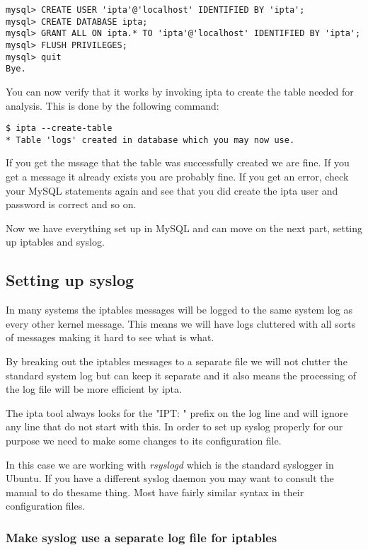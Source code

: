 \documentclass[english,twoside,openright,a4paper,12pt]{article}
\begin{document}
\small
\begin{verbatim}
mysql> CREATE USER 'ipta'@'localhost' IDENTIFIED BY 'ipta';
mysql> CREATE DATABASE ipta;
mysql> GRANT ALL ON ipta.* TO 'ipta'@'localhost' IDENTIFIED BY 'ipta';
mysql> FLUSH PRIVILEGES;
mysql> quit
Bye.
\end{verbatim}
\normalsize

You can now verify that it works by invoking ipta to create the table 
needed for analysis. This is done by the following command:

\begin{verbatim}
$ ipta --create-table
* Table 'logs' created in database which you may now use.
\end{verbatim}

If you get the mssage that the table was successfully created we are
fine. If you get a message it already exists you are probably fine. If
you get an error, check your MySQL statements again and see that you
did create the ipta user and password is correct and so on.

Now we have everything set up in MySQL and can move on the next part,
setting up iptables and syslog.

\subsection{Setting up syslog}

In many systems the iptables messages will be logged to the same
system log as every other kernel message. This means we will have logs
cluttered with all sorts of messages making it hard to see what is
what.

By breaking out the iptables messages to a separate file we will not
clutter the standard system log but can keep it separate and it also
means the processing of the log file will be more efficient by ipta.

The ipta tool always looks for the "IPT: " prefix on the log line
and will ignore any line that do not start with this. In order to set
up syslog properly for our purpose we need to make some changes to its
configuration file.

In this case we are working with \textit{rsyslogd} which is the
standard syslogger in Ubuntu. If you have a different syslog daemon
you may want to consult the manual to do thesame thing. Most have
fairly similar syntax in their configuration files.

\subsubsection{Make syslog use a separate log file for iptables}
\end{document}
